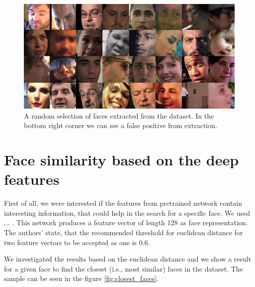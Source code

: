 \begin{figure}
    \centering
    \includegraphics[width=0.98\linewidth]{img/random_sample_faces.png}
    \caption{A random selection of faces extracted from the dataset. In the bottom right corner we can see a false positive from extraction.}
    \label{fig:random_selection_faces}
\end{figure}

\section{Face similarity based on the deep features}


First of all, we were interested if the features from pretrained network contain interesting information, that could help in the search for a specific face. We used ... . This network produces a feature vector of length 128 as face representation. The authors' state, that the recommended threshold for euclidean distance for two feature vectors to be accepted as one is 0.6.

We investigated the results based on the euclidean distance and we show a result for a given face to find the closest (i.e., most similar) faces in the dataset. The sample can be seen in the figure \ref{fig:closest_faces}.



